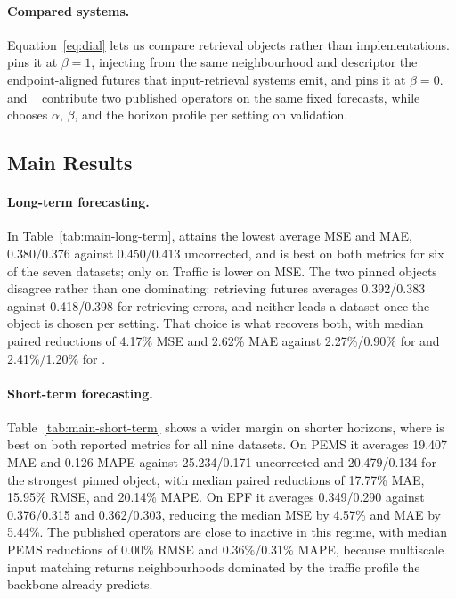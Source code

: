 \paragraph{Compared systems.}
Equation~\ref{eq:dial} lets us compare retrieval objects rather than
implementations. \analogknn{} pins it at $\beta=1$, injecting from the same
neighbourhood and descriptor the endpoint-aligned futures that input-retrieval
systems emit, and \residualknn{} pins it at $\beta=0$.
\raft{}~\citep{han2025raft} and \saraf{}~\citep{zhou2026saraf} contribute two
published operators on the same fixed forecasts, while \method{} chooses $\alpha$,
$\beta$, and the horizon profile per setting on validation.

\subsection{Main Results}
\label{sec:exp-main}




\paragraph{Long-term forecasting.}
In Table~\ref{tab:main-long-term}, \method{} attains the lowest average MSE and
MAE, 0.380/0.376 against 0.450/0.413 uncorrected, and is best on both metrics for
six of the seven datasets; only on Traffic is \residualknn{} lower on MSE. The two
pinned objects disagree rather than one dominating: retrieving futures averages
0.392/0.383 against 0.418/0.398 for retrieving errors, and neither leads a dataset
once the object is chosen per setting. That choice is what recovers both, with median
paired reductions of 4.17\% MSE and 2.62\% MAE against 2.27\%/0.90\% for \analogknn{}
and 2.41\%/1.20\% for \residualknn{}.

\paragraph{Short-term forecasting.}
Table~\ref{tab:main-short-term} shows a wider margin on shorter horizons, where
\method{} is best on both reported metrics for all nine datasets. On PEMS it
averages 19.407 MAE and 0.126 MAPE against 25.234/0.171 uncorrected and
20.479/0.134 for the strongest pinned object, with median paired reductions of
17.77\% MAE, 15.95\% RMSE, and 20.14\% MAPE. On EPF it averages 0.349/0.290
against 0.376/0.315 and 0.362/0.303, reducing the median MSE by 4.57\% and MAE by
5.44\%. The published operators are close to inactive in this regime, with median
PEMS reductions of 0.00\% RMSE and 0.36\%/0.31\% MAPE, because multiscale input
matching returns neighbourhoods dominated by the traffic profile the backbone
already predicts.

